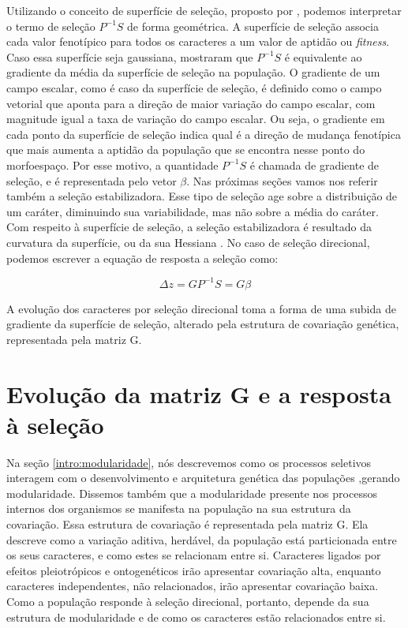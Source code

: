 Utilizando o conceito de superfície de seleção, proposto por
\cite{Wright1932}, podemos interpretar o termo de seleção $P^{-1}S$ de
forma geométrica.
A superfície de seleção associa cada valor fenotípico para todos os
caracteres a um valor de aptidão ou {\it fitness}.
Caso essa superfície seja gaussiana, \cite{Lande1983} mostraram que 
$P^{-1}S$ é equivalente ao gradiente da média da superfície de seleção
na população.
O gradiente de um campo escalar, como é caso da superfície de seleção,
é definido como o campo vetorial que aponta para a direção de maior
variação do campo escalar, com magnitude igual a taxa de variação do
campo escalar.
Ou seja, o gradiente em cada ponto da superfície de seleção indica qual
é a direção de mudança fenotípica que mais aumenta a aptidão da
população que se encontra nesse ponto do morfoespaço.
Por esse motivo, a quantidade $P^{-1}S$ é chamada
de gradiente de seleção, e é representada pelo vetor $\beta$.
Nas próximas seções vamos nos referir também a seleção estabilizadora.
Esse tipo de seleção age sobre a distribuição de um caráter, diminuindo
sua variabilidade, mas não sobre a média do caráter.
Com respeito à superfície de seleção, a seleção estabilizadora é
resultado da curvatura da superfície, ou da sua Hessiana
\citep{Lande1983}.
No caso de seleção direcional, podemos escrever a equação de resposta a seleção como:

\begin{equation}
    \Delta z = GP^{-1}S = G\beta
\end{equation}

A evolução dos caracteres por seleção direcional toma a forma de uma
subida de gradiente da superfície de seleção, alterado pela estrutura de
covariação genética, representada pela matriz G.

\section{Evolução da matriz $\mathbf{G}$ e a resposta à seleção}\label{intro:matG}

Na seção \ref{intro:modularidade}, nós descrevemos como os processos
seletivos interagem com o desenvolvimento e arquitetura genética das
populações ,gerando modularidade.
Dissemos também que a modularidade presente nos processos internos dos
organismos se manifesta na população na sua estrutura da covariação.
Essa estrutura de covariação é representada pela matriz G.
Ela descreve como a variação aditiva, herdável, da população está particionada entre os
seus caracteres, e como estes se relacionam entre si.
Caracteres ligados por efeitos pleiotrópicos e ontogenéticos irão
apresentar covariação alta, enquanto caracteres independentes, não
relacionados, irão apresentar covariação baixa.
Como a população responde à seleção direcional, portanto, depende da sua estrutura
de modularidade e de como os caracteres estão relacionados entre si.

